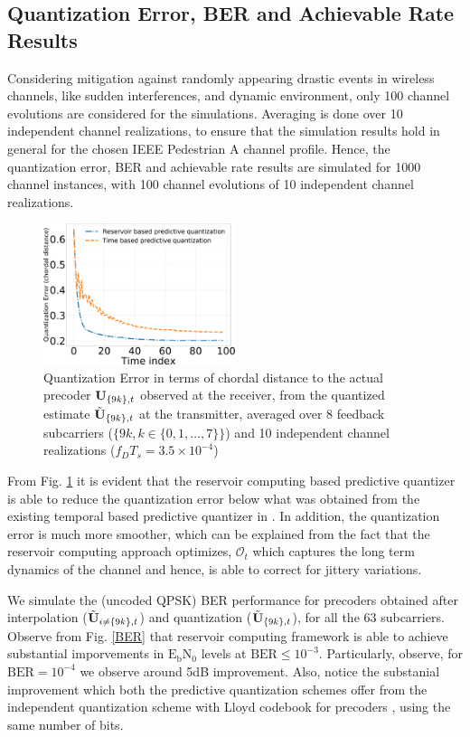 \documentclass[conference]{IEEEtran}
\begin{document}
\subsection{Quantization Error, BER and Achievable Rate Results}
\label{res}
Considering mitigation against randomly appearing drastic events in wireless channels, like sudden interferences, and dynamic environment, only 100 channel evolutions are considered for the simulations. Averaging is done over 10 independent channel realizations, to ensure that the simulation results hold in general for the chosen IEEE Pedestrian A channel profile. Hence, the quantization error, BER and achievable rate results are simulated for 1000 channel instances, with 100 channel evolutions of 10 independent channel realizations.
\begin{figure}[h]
\centering
\includegraphics[width=0.5\textwidth]{images/qtizErr.pdf}
\caption{Quantization Error in terms of chordal distance to the actual precoder ${\bf U}_{\{9k\},t}$ observed at the receiver, from the quantized estimate $\tilde{{\bf U}}_{\{9k\},t}$ at the transmitter, averaged over 8 feedback subcarriers ($\{9k, k \in \{0,1,\ldots,7\}\}$) and 10 independent channel realizations ($f_DT_s=3.5\times10^{-4}$)}
\label{qtiz_err}
\end{figure}

From Fig. \ref{qtiz_err} it is evident that the reservoir computing based predictive quantizer is able to reduce the quantization error below what was obtained from the existing temporal based predictive quantizer in \cite{6891198}. In addition, the quantization error is much more smoother, which can be explained from the fact that the reservoir computing approach optimizes, $\mathcal{O}_t$ which captures the long term dynamics of the channel and hence, is able to correct for jittery variations.

We simulate the (uncoded QPSK) BER performance for precoders obtained after interpolation ($\tilde{{\bf U}}_{i\neq\{9k\},t}$) and quantization ($\tilde{{\bf U}}_{\{9k\},t}$), for all the 63 subcarriers. Observe from Fig. \ref{BER} that reservoir computing framework is able to achieve substantial imporvements in $\text{E}_\text{b}\text{N}_0$ levels at $\text{BER}\leq 10^{-3}$. Particularly, observe, for $\text{BER}=10^{-4}$ we observe around 5dB improvement. Also, notice the substanial improvement which both the predictive quantization schemes offer from the independent quantization scheme with Lloyd codebook for precoders \cite{6678348}, using the same number of bits. 
\end{document}
